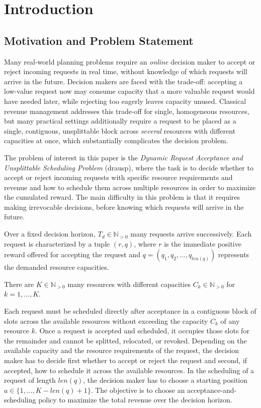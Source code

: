 \section{Introduction}
\label{sec:introduction}
\subsection{Motivation and Problem Statement}
\label{subsec:motivation}

Many real-world planning problems require an \textit{online} decision maker to accept or reject incoming requests in real time, without knowledge of which requests will arrive in the future. Decision makers are faced with the trade-off: accepting a low-value request now may consume capacity that a more valuable
request would have needed later, while rejecting too eagerly leaves capacity unused. Classical
revenue management addresses this trade-off for single, homogeneous resources, but many practical
settings additionally require a request to be placed as a single, contiguous, unsplittable block
across \emph{several} resources with different capacities at once, which substantially complicates the
decision problem.

The problem of interest in this paper is the \emph{Dynamic Request Acceptance and Unsplittable Scheduling
Problem} (\acs{drausp}), where the task is to decide whether to accept or reject incoming requests with specific resource requirements and revenue and how to schedule them across multiple resources in order to  maximize the cumulated reward. The main difficulty in this problem is that it requires making irrevocable decisions, before knowing which requests will arrive in the future.

Over a fixed decision horizon, $T_d \in \mathbb{N}_{>0}$ many requests arrive successively. Each request is characterized by a tuple $(r,q)$, where $r$ is the immediate positive reward offered for accepting the request and $q = (q_1, q_2, \ldots, q_{len(q)})$ represents the demanded resource capacities.

There are $K \in \mathbb{N}_{>0}$ many resources with different capacities $C_k \in \mathbb{N}_{>0}$ for $k = 1, \ldots, K$. 

Each request must be scheduled directly after acceptance in a contiguous block of slots across the available resources without exceeding the capacity $C_k$ of any resource $k$. Once a request is accepted and scheduled, it occupies those slots for the remainder and cannot be splitted, relocated, or revoked. 
Depending on the available capacity and the resource requirements of the request, the decision maker has to decide first whether to accept or reject the request and second, if accepted, how to schedule it across the available resources. In the scheduling of a request of length $len(q)$, the decision maker has to choose a starting position $a \in \{1, \ldots, K - len(q) + 1\}$.
The objective is to choose an acceptance-and-scheduling policy to maximize the total revenue over the decision horizon.


